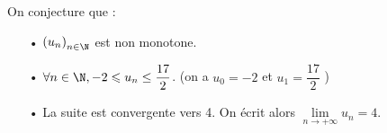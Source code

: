 \vspace*{.5cm}

On conjecture que  :
\begin{itemize}
\item[•] $\left(u_n\right)_{n \in \N}$ est non monotone.
\item[•] $\forall n \in \N, -2 \leqslant u_n \leq \dfrac{17}{2}$. (on a $u_0 = -2$ et $u_1 = \dfrac{17}{2}$ )
\item[•] La suite est convergente vers 4. On écrit alors $\lim\limits_{n \to +\infty} u_n = 4$. 
\end{itemize}